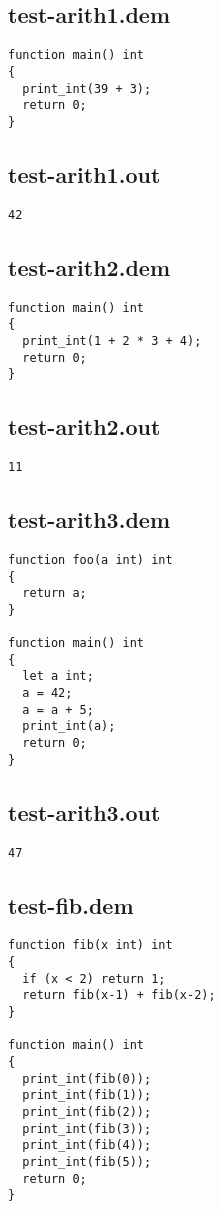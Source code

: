 \subsection{test-arith1.dem}
\begin{lstlisting}
function main() int
{
  print_int(39 + 3);
  return 0;
}
\end{lstlisting}
\subsection{test-arith1.out}
\begin{lstlisting}
42
\end{lstlisting}
\subsection{test-arith2.dem}
\begin{lstlisting}
function main() int
{
  print_int(1 + 2 * 3 + 4);
  return 0;
}
\end{lstlisting}
\subsection{test-arith2.out}
\begin{lstlisting}
11
\end{lstlisting}
\subsection{test-arith3.dem}
\begin{lstlisting}
function foo(a int) int
{
  return a;
}

function main() int
{
  let a int;
  a = 42;
  a = a + 5;
  print_int(a);
  return 0;
}
\end{lstlisting}
\subsection{test-arith3.out}
\begin{lstlisting}
47
\end{lstlisting}
\subsection{test-fib.dem}
\begin{lstlisting}
function fib(x int) int
{
  if (x < 2) return 1;
  return fib(x-1) + fib(x-2);
}

function main() int
{
  print_int(fib(0));
  print_int(fib(1));
  print_int(fib(2));
  print_int(fib(3));
  print_int(fib(4));
  print_int(fib(5));
  return 0;
}
\end{lstlisting}
